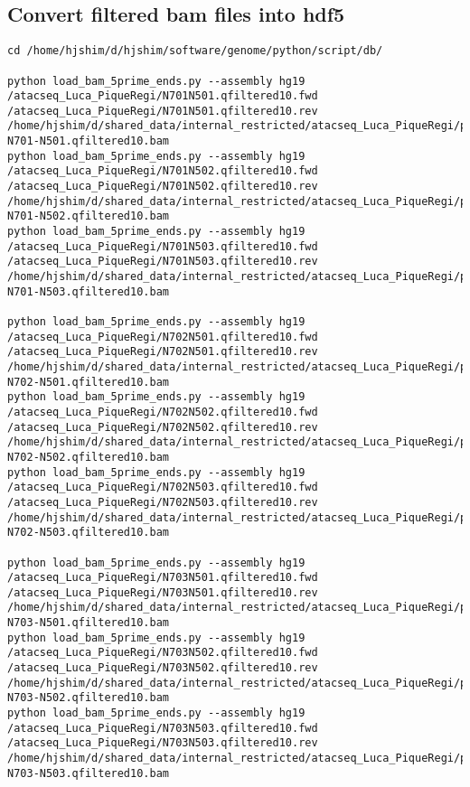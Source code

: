 \documentclass[11pt]{article}
\begin{document}
\subsection{Convert filtered bam files into hdf5}
\label{sec-2-5}
\begin{lstlisting}
cd /home/hjshim/d/hjshim/software/genome/python/script/db/

python load_bam_5prime_ends.py --assembly hg19 /atacseq_Luca_PiqueRegi/N701N501.qfiltered10.fwd /atacseq_Luca_PiqueRegi/N701N501.qfiltered10.rev /home/hjshim/d/shared_data/internal_restricted/atacseq_Luca_PiqueRegi/processedbamfiles/AT2-N701-N501.qfiltered10.bam
python load_bam_5prime_ends.py --assembly hg19 /atacseq_Luca_PiqueRegi/N701N502.qfiltered10.fwd /atacseq_Luca_PiqueRegi/N701N502.qfiltered10.rev /home/hjshim/d/shared_data/internal_restricted/atacseq_Luca_PiqueRegi/processedbamfiles/AT2-N701-N502.qfiltered10.bam
python load_bam_5prime_ends.py --assembly hg19 /atacseq_Luca_PiqueRegi/N701N503.qfiltered10.fwd /atacseq_Luca_PiqueRegi/N701N503.qfiltered10.rev /home/hjshim/d/shared_data/internal_restricted/atacseq_Luca_PiqueRegi/processedbamfiles/AT2-N701-N503.qfiltered10.bam

python load_bam_5prime_ends.py --assembly hg19 /atacseq_Luca_PiqueRegi/N702N501.qfiltered10.fwd /atacseq_Luca_PiqueRegi/N702N501.qfiltered10.rev /home/hjshim/d/shared_data/internal_restricted/atacseq_Luca_PiqueRegi/processedbamfiles/AT2-N702-N501.qfiltered10.bam
python load_bam_5prime_ends.py --assembly hg19 /atacseq_Luca_PiqueRegi/N702N502.qfiltered10.fwd /atacseq_Luca_PiqueRegi/N702N502.qfiltered10.rev /home/hjshim/d/shared_data/internal_restricted/atacseq_Luca_PiqueRegi/processedbamfiles/AT2-N702-N502.qfiltered10.bam
python load_bam_5prime_ends.py --assembly hg19 /atacseq_Luca_PiqueRegi/N702N503.qfiltered10.fwd /atacseq_Luca_PiqueRegi/N702N503.qfiltered10.rev /home/hjshim/d/shared_data/internal_restricted/atacseq_Luca_PiqueRegi/processedbamfiles/AT2-N702-N503.qfiltered10.bam

python load_bam_5prime_ends.py --assembly hg19 /atacseq_Luca_PiqueRegi/N703N501.qfiltered10.fwd /atacseq_Luca_PiqueRegi/N703N501.qfiltered10.rev /home/hjshim/d/shared_data/internal_restricted/atacseq_Luca_PiqueRegi/processedbamfiles/AT2-N703-N501.qfiltered10.bam
python load_bam_5prime_ends.py --assembly hg19 /atacseq_Luca_PiqueRegi/N703N502.qfiltered10.fwd /atacseq_Luca_PiqueRegi/N703N502.qfiltered10.rev /home/hjshim/d/shared_data/internal_restricted/atacseq_Luca_PiqueRegi/processedbamfiles/AT2-N703-N502.qfiltered10.bam
python load_bam_5prime_ends.py --assembly hg19 /atacseq_Luca_PiqueRegi/N703N503.qfiltered10.fwd /atacseq_Luca_PiqueRegi/N703N503.qfiltered10.rev /home/hjshim/d/shared_data/internal_restricted/atacseq_Luca_PiqueRegi/processedbamfiles/AT2-N703-N503.qfiltered10.bam


\end{lstlisting}
\end{document}
